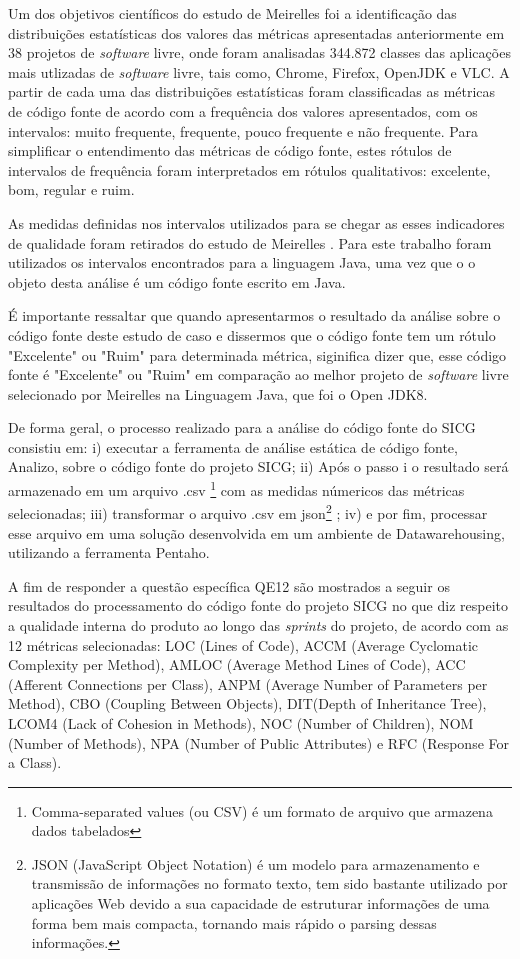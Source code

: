 Um dos objetivos científicos do estudo de Meirelles \cite{Meirelles2013} foi a identificação das distribuições estatísticas dos valores das métricas apresentadas anteriormente em 38 projetos de \textit{software} livre, onde foram analisadas 344.872 classes das aplicações mais utlizadas de \textit{software} livre, tais como, Chrome, Firefox, OpenJDK e VLC. A partir de cada uma das distribuições estatísticas foram classificadas as métricas de código fonte de acordo com a frequência dos valores apresentados,
com os intervalos: muito frequente, frequente, pouco frequente e não frequente. Para simplificar o entendimento das métricas de código fonte,  estes rótulos de
intervalos de frequência foram interpretados em rótulos qualitativos: excelente, bom, regular e ruim.


As medidas definidas nos intervalos utilizados para se chegar as esses indicadores de qualidade foram retirados do
estudo de Meirelles \cite{Meirelles2013}. Para este trabalho foram utilizados os intervalos encontrados para a linguagem Java, uma vez que o o objeto desta análise é um código fonte escrito em Java.

É importante ressaltar que quando apresentarmos o resultado da análise sobre o código fonte deste estudo de caso e dissermos que o código fonte tem um rótulo "Excelente" ou "Ruim" para determinada métrica, siginifica dizer que, esse código fonte é "Excelente" ou "Ruim" em comparação ao melhor projeto de \textit{software} livre selecionado por Meirelles \cite{Meirelles2013} na Linguagem Java, que foi o Open JDK8.


De forma geral, o processo realizado para a análise do código fonte do SICG consistiu em: i) executar a ferramenta de análise estática de código fonte, Analizo, sobre o código fonte do projeto SICG; ii) Após o passo i o resultado será armazenado em um arquivo .csv \footnote{Comma-separated values (ou CSV) é um formato de arquivo que armazena dados tabelados} com as medidas númericos das métricas selecionadas; iii) transformar o arquivo .csv em json\footnote{JSON (JavaScript Object Notation) é um modelo para armazenamento e transmissão de informações no formato texto, tem sido bastante utilizado por aplicações Web devido a sua capacidade de estruturar informações de uma forma bem mais compacta, tornando mais rápido o parsing dessas informações.} ; iv) e por fim, processar esse arquivo em uma solução desenvolvida em um ambiente de Datawarehousing, utilizando a ferramenta Pentaho. 

A fim de responder a questão específica QE12 são mostrados a seguir os resultados do processamento do código fonte do projeto SICG no que diz respeito a qualidade interna do produto ao longo das \textit{sprints} do projeto, 
de acordo com as 12 métricas selecionadas: LOC (Lines of Code), ACCM (Average Cyclomatic Complexity per Method), AMLOC (Average Method Lines of Code), ACC (Afferent Connections per Class), ANPM (Average Number of Parameters per Method),
CBO (Coupling Between Objects), DIT(Depth of Inheritance Tree), LCOM4 (Lack of Cohesion in Methods), NOC (Number of Children), NOM (Number of Methods), NPA (Number of Public Attributes) e RFC (Response For a Class).


